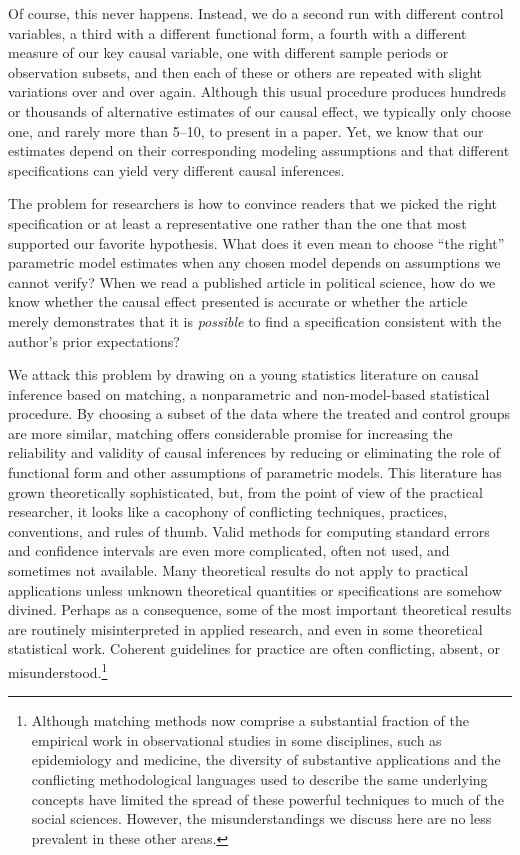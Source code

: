\documentclass[11pt,titlepage]{article}
\begin{document}
Of course, this never happens.  Instead, we do a second run with
different control variables, a third with a different functional form,
a fourth with a different measure of our key causal variable, one with
different sample periods or observation subsets, and then each of
these or others are repeated with slight variations over and over
again.  Although this usual procedure produces hundreds or thousands
of alternative estimates of our causal effect, we typically only
choose one, and rarely more than 5--10, to present in a paper.  Yet,
we know that our estimates depend on their corresponding modeling
assumptions and that different specifications can yield very different
causal inferences.

The problem for researchers is how to convince readers that we picked
the right specification or at least a representative one rather than
the one that most supported our favorite hypothesis.  What does it
even mean to choose ``the right'' parametric model estimates when any
chosen model depends on assumptions we cannot verify?  When we read a
published article in political science, how do we know whether the
causal effect presented is accurate or whether the article merely
demonstrates that it is \emph{possible} to find a specification
consistent with the author's prior expectations?

We attack this problem by drawing on a young statistics literature on
causal inference based on matching, a nonparametric and
non-model-based statistical procedure.  By choosing a subset of the
data where the treated and control groups are more similar, matching
offers considerable promise for increasing the reliability and
validity of causal inferences by reducing or eliminating the role of
functional form and other assumptions of parametric models.  This
literature has grown theoretically sophisticated, but, from the point
of view of the practical researcher, it looks like a cacophony of
conflicting techniques, practices, conventions, and rules of thumb.
Valid methods for computing standard errors and confidence intervals
are even more complicated, often not used, and sometimes not
available.  Many theoretical results do not apply to practical
applications unless unknown theoretical quantities or specifications
are somehow divined.  Perhaps as a consequence, some of the most
important theoretical results are routinely misinterpreted in applied
research, and even in some theoretical statistical work.  Coherent
guidelines for practice are often conflicting, absent, or
misunderstood.\footnote{Although matching methods now comprise a
  substantial fraction of the empirical work in observational studies
  in some disciplines, such as epidemiology and medicine, the
  diversity of substantive applications and the conflicting
  methodological languages used to describe the same underlying
  concepts have limited the spread of these powerful techniques to
  much of the social sciences.  However, the misunderstandings we
  discuss here are no less prevalent in these other areas.}
\end{document}
